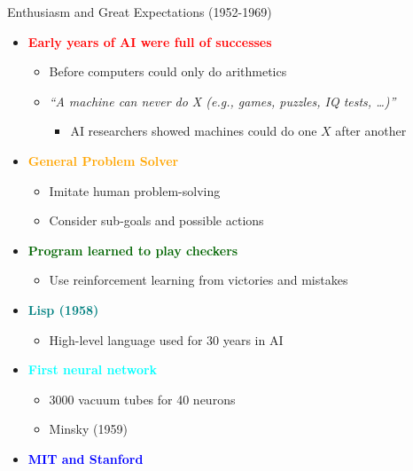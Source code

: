 \documentclass[
  10pt,
  ignorenonframetext,
]{beamer}
\providecommand{\tightlist}{%
  \setlength{\itemsep}{0pt}\setlength{\parskip}{0pt}}
\begin{document}
\begin{frame}{Enthusiasm and Great Expectations (1952-1969)}
\label{enthusiasm-and-great-expectations-1952-1969}
\begin{itemize}
\tightlist
\item
  \textbf{\textcolor{red}{Early years of AI were full of successes}}

  \begin{itemize}
  \tightlist
  \item
    Before computers could only do arithmetics
  \item
    \emph{``A machine can never do X (e.g., games, puzzles, IQ tests,
    \ldots)''}

    \begin{itemize}
    \tightlist
    \item
      AI researchers showed machines could do one \(X\) after another
    \end{itemize}
  \end{itemize}
\item
  \textbf{\textcolor{orange}{General Problem Solver}}

  \begin{itemize}
  \tightlist
  \item
    Imitate human problem-solving
  \item
    Consider sub-goals and possible actions
  \end{itemize}
\item
  \textbf{\textcolor{darkgreen}{Program learned to play checkers}}

  \begin{itemize}
  \tightlist
  \item
    Use reinforcement learning from victories and mistakes
  \end{itemize}
\item
  \textbf{\textcolor{teal}{Lisp (1958)}}

  \begin{itemize}
  \tightlist
  \item
    High-level language used for 30 years in AI
  \end{itemize}
\item
  \textbf{\textcolor{cyan}{First neural network}}

  \begin{itemize}
  \tightlist
  \item
    3000 vacuum tubes for 40 neurons
  \item
    Minsky (1959)
  \end{itemize}
\item
  \textbf{\textcolor{blue}{MIT and Stanford}}


\end{itemize}
\end{frame}
\end{document}
